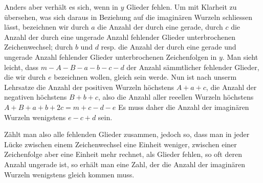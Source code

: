 \documentclass[14pt]{memoir}
\theoremstyle{plain}
\theoremstyle{remark}
\begin{document}
Anders aber verhält es sich, wenn in \(y\) Glieder fehlen.   Um mit Klarheit %
zu übersehen, was sich daraus in Beziehung auf die imaginären Wurzeln schliessen lässt, bezeichnen wir durch \(a\) die Anzahl der durch eine gerade, durch \(c\) die Anzahl der durch eine ungerade Anzahl fehlender Glieder unterbrochenen Zeichenwechsel; durch \(b\) und \(d\) resp. die Anzahl der durch eine gerade und ungerade Anzahl fehlender Glieder unterbrochenen Zeichenfolgen in \(y\). Man sieht leicht, dass \(m-A-B-a-b-c-d\) der Anzahl sämmtlicher fehlender Glieder, die wir durch \(e\) bezeichnen wollen, gleich sein werde. Nun ist nach unserm Lehrsatze die Anzahl der positiven Wurzeln höchstens \(A+a+c\), die Anzahl der negativen höchstens \(B+b+c\), also die Anzahl aller reeellen Wurzeln höchstens
\(A+B+a+b+2c=m+c-d-e\)
Es muss daher die Anzahl der imaginären Wurzeln wenigstens \(e-c+d\) sein. 

Zählt man also alle fehlenden Glieder zusammen, jedoch so, dass man in jeder Lücke zwischen einem Zeichenwechsel eine Einheit weniger, zwischen einer Zeichenfolge aber eine Einheit mehr rechnet, als Glieder fehlen, so oft deren Anzahl ungerade ist, so erhält man eine Zahl, der die Anzahl der imaginären Wurzeln wenigstens gleich kommen muss.
\end{document}
